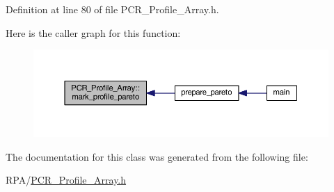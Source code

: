 Definition at line 80 of file P\+C\+R\+\_\+\+Profile\+\_\+\+Array.\+h.

Here is the caller graph for this function\+:
\nopagebreak
\begin{figure}[H]
\begin{center}
\leavevmode
\includegraphics[width=350pt]{class_p_c_r___profile___array_a57b22954d1a22097d45dc9083d147605_icgraph}
\end{center}
\end{figure}


The documentation for this class was generated from the following file\+:\begin{DoxyCompactItemize}
\item 
R\+P\+A/\mbox{\hyperlink{_p_c_r___profile___array_8h}{P\+C\+R\+\_\+\+Profile\+\_\+\+Array.\+h}}\end{DoxyCompactItemize}
